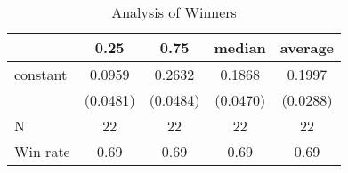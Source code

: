 \begin{table}
\caption{Analysis of Winners}
\begin{center}
\begin{tabular}{lcccc}
\hline
         &   0.25   &   0.75   &  median  & average   \\
\midrule
\midrule
constant & 0.0959   & 0.2632   & 0.1868   & 0.1997    \\
         & (0.0481) & (0.0484) & (0.0470) & (0.0288)  \\
N        & 22       & 22       & 22       & 22        \\
Win rate & 0.69     & 0.69     & 0.69     & 0.69      \\
\hline
\end{tabular}
\end{center}
\end{table}